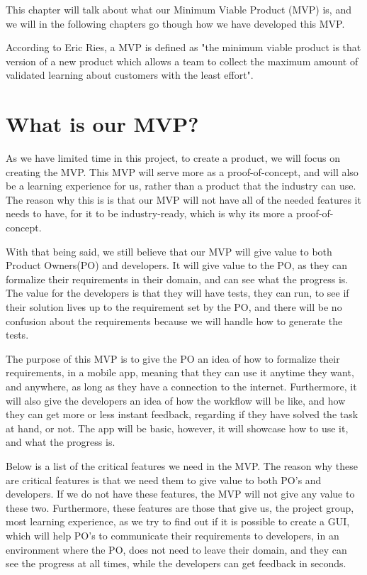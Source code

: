 This chapter will talk about what our Minimum Viable Product (MVP) is, and we will in the following chapters go though how we have developed this MVP.

According to Eric Ries, a MVP is defined as "the minimum viable product is that version of a new product which allows a team to collect the maximum amount of validated learning about customers with the least effort"\cite{whatIsMVP}.

\section{What is our MVP?}
As we have limited time in this project, to create a product, we will focus on creating the MVP.
This MVP will serve more as a proof-of-concept, and will also be a learning experience for us, rather than a product that the industry can use.
The reason why this is is that our MVP will not have all of the needed features it needs to have, for it to be industry-ready, which is why its more a proof-of-concept.

With that being said, we still believe that our MVP will give value to both Product Owners(PO) and developers.
It will give value to the PO, as they can formalize their requirements in their domain, and can see what the progress is.
The value for the developers is that they will have tests, they can run, to see if their solution lives up to the requirement set by the PO, and there will be no confusion about the requirements because we will handle how to generate the tests. 

The purpose of this MVP is to give the PO an idea of how to formalize their requirements, in a mobile app, meaning that they can use it anytime they want, and anywhere, as long as they have a connection to the internet.
Furthermore, it will also give the developers an idea of how the workflow will be like, and how they can get more or less instant feedback, regarding if they have solved the task at hand, or not. 
The app will be basic, however, it will showcase how to use it, and what the progress is.

Below is a list of the critical features we need in the MVP.
The reason why these are critical features is that we need them to give value to both PO's and developers.
If we do not have these features, the MVP will not give any value to these two.
Furthermore, these features are those that give us, the project group, most learning experience, as we try to find out if it is possible to create a GUI, which will help PO's to communicate their requirements to developers, in an environment where the PO, does not need to leave their domain, and they can see the progress at all times, while the developers can get feedback in seconds.

